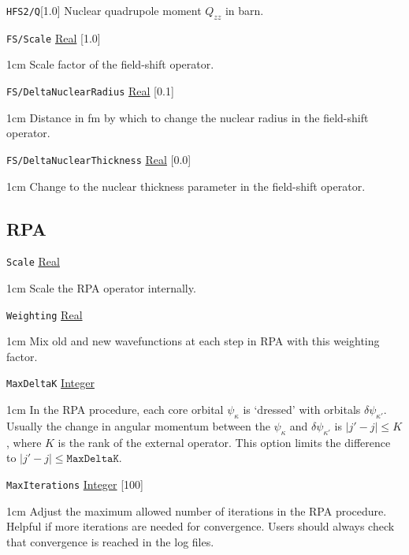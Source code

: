 \documentclass{report}
\begin{document}
\texttt{HFS2/Q}[1.0]
Nuclear quadrupole moment $Q_{zz}$ in barn.

\texttt{FS/Scale} \uline{Real} [1.0]
\begin{adjustwidth}{1cm}{}
Scale factor of the field-shift operator.
\end{adjustwidth}

\texttt{FS/DeltaNuclearRadius} \uline{Real} [0.1]
\begin{adjustwidth}{1cm}{}
Distance in fm by which to change the nuclear radius in the field-shift operator. 
\end{adjustwidth}

\texttt{FS/DeltaNuclearThickness} \uline{Real} [0.0]
\begin{adjustwidth}{1cm}{}
Change to the nuclear thickness parameter in the field-shift operator.
\end{adjustwidth}

\subsection{RPA}

\texttt{Scale} \uline{Real}
\begin{adjustwidth}{1cm}{}
Scale the RPA operator internally.
\end{adjustwidth}

\texttt{Weighting} \uline{Real}
\begin{adjustwidth}{1cm}{}
Mix old and new wavefunctions at each step in RPA with this weighting factor.
\end{adjustwidth}

\texttt{MaxDeltaK} \uline{Integer}
\begin{adjustwidth}{1cm}{}
	In the RPA procedure, each core orbital $\psi_\kappa$ is `dressed' with orbitals $\delta\psi_{\kappa'}$. Usually the change in angular momentum between the $\psi_\kappa$ and $\delta\psi_{\kappa'}$ is $|j' - j| \leq K$, where $K$ is the rank of the external operator.
	This option limits the difference to $|j' - j|\leq \texttt{MaxDeltaK}$.
\end{adjustwidth}

\texttt{MaxIterations} \uline{Integer} [100]
\begin{adjustwidth}{1cm}{}
	Adjust the maximum allowed number of iterations in the RPA procedure. Helpful if more iterations are needed for convergence. Users should always check that convergence is reached in the log files.
\end{adjustwidth}
\end{document}
